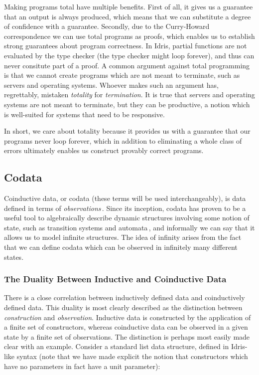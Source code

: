 Making programs total have multiple benefits. First of all, it gives us a guarantee that an output is always produced, which means that we can substitute a degree of confidence with a guarantee. Secondly, due to the Curry-Howard correspondence we can use total programs as proofs, which enables us to establish strong guarantees about program correctness. In Idris, partial functions are not evaluated by the type checker (the type checker might loop forever), and thus can never consitute part of a proof. A common argument against total programming is that we cannot create programs which are not meant to terminate, such as servers and operating systems. Whoever makes such an argument has, regrettably, mistaken \emph{totality} for \emph{termination}. It is true that servers and operating systems are not meant to terminate, but they can be productive, a notion which is well-suited for systems that need to be responsive.

In short, we care about totality because it provides us with a guarantee that our programs never loop forever, which in addition to eliminating a whole class of errors ultimately enables us construct provably correct programs.


\subsection{Codata}
\label{sec:codata}
Coinductive data, or codata (these terms will be used interchangeably), is data defined in terms of \emph{observations}\,\citep{Jacobs97atutorial}. Since its inception, codata has proven to be a useful tool to algebraically describe dynamic structures involving some notion of state, such as transition systems and automata\,\citep{Jacobs97atutorial}, and informally we can say that it allows us to model infinite structures. The idea of infinity arises from the fact that we can define codata which can be observed in infinitely many different states.

\subsubsection{The Duality Between Inductive and Coinductive Data} There is a close correlation between inductively defined data and coinductively defined data. This duality is most clearly described as the distinction between \emph{construction} and \emph{observation}. Inductive data is constructed by the application of a finite set of constructors, whereas coinductive data can be observed in a given state by a finite set of observations. The distinction is perhaps most easily made clear with an example. Consider a standard list data structure, defined in Idris-like syntax (note that we have made explicit the notion that constructors which have no parameters in fact have a unit parameter):

